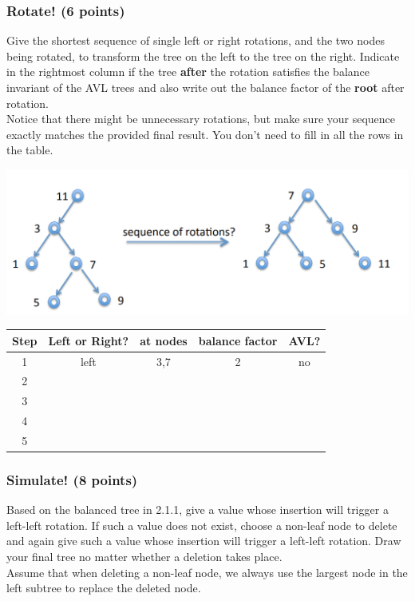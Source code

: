 \documentclass[11pt]{exam}
\begin{document}
\subsubsection{Rotate! (6 points)}
Give the shortest sequence of single left or right rotations, and the two nodes being rotated, to transform the tree on the left to the tree on the right. Indicate in the rightmost column if the tree \textbf{after} the rotation satisfies the balance invariant of the AVL trees and also write out the balance factor of the \textbf{root} after rotation.\\
Notice that there might be unnecessary rotations, but make sure your sequence exactly matches the provided final result. You don't need to fill in all the rows in the table.
\begin{center}
    \includegraphics[scale=0.4]{AVL_rotation.png}
\end{center}
\begin{center}
    \begin{tabular}{|c|c|c|c|c|}
    \hline
    Step & Left or Right? & at nodes & balance factor & AVL? \\
    \hline
    1 & left & 3,7 & 2 & no \\
    \hline
    2 & & & & \\
    \hline
    3 & & & & \\
    \hline
    4 & & & & \\
    \hline
    5 & & & & \\
    \hline
\end{tabular}
\end{center}

\subsubsection{Simulate! (8 points)}
    Based on the balanced tree in 2.1.1, give a value whose insertion will trigger a {\color{red}left-left} rotation. If such a value does not exist, choose a non-leaf node to delete and again give such a value whose insertion will trigger a left-left rotation. Draw your final tree no matter whether a deletion takes place.\\
    Assume that when deleting a non-leaf node, we always use the largest node in the left subtree to replace the deleted node.
    \begin{solution}
    \end{solution}
\end{document}
